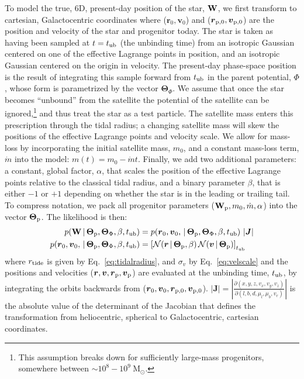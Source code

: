 \documentclass[letterpaper,12pt,preprint]{aastex}
\newcommand{\given}{\,|\,}
\newcommand{\msun}{\mathrm{M}_\odot}
\newcommand{\W}{{\bf W}}
\newcommand{\J}{{\boldsymbol J}}
\newcommand{\rtide}{r_{\rm tide}}
\newcommand{\bs}{\boldsymbol}
\newcommand{\sat}{{\rm p}}
\newcommand{\tub}{t_{\rm ub}}
\newcommand{\tailbit}{\beta}
\newcommand{\Loffset}{\alpha}
\begin{document}
To model the true, 6D, present-day position of the star, $\W$, we first transform to cartesian, Galactocentric coordinates where ($\bs{r}_0,\bs{v}_0$) and ($\bs{r}_{\sat,0},\bs{v}_{\sat,0}$) are the position and velocity of the star and progenitor today. The star is taken as having been sampled at $t=\tub$ (the unbinding time) from an isotropic Gaussian centered on one of the effective Lagrange points in position, and an isotropic Gaussian centered on the origin in velocity. The present-day phase-space position is the result of integrating this sample forward from $\tub$ in the parent potential, $\Phi$, whose form is parametrized by the vector $\bs{\Theta}_\Phi$. We assume that once the star becomes ``unbound'' from the satellite the potential of the satellite can be ignored,\footnote{This assumption breaks down for sufficiently large-mass progenitors, somewhere between $\sim10^8-10^9~\msun$.} and thus treat the star as a test particle. The satellite mass enters this prescription through the tidal radius; a changing satellite mass will skew the positions of the effective Lagrange points and velocity scale. We allow for mass-loss by incorporating the initial satellite mass, $m_0$, and a constant mass-loss term, $\dot{m}$ into the model: $m(t) = m_0 - \dot{m}t$. Finally, we add two additional parameters: a constant, global factor, $\Loffset$, that scales the position of the effective Lagrange points relative to the classical tidal radius, and a binary parameter $\tailbit$, that is either $-1$ or $+1$ depending on whether the star is in the leading or trailing tail. To compress notation, we pack all progenitor parameters ($\W_\sat, m_0, \dot{m}, \Loffset$) into the vector $\bs{\Theta}_\sat$. The likelihood is then: %
\begin{align}
	p(\W \given \bs{\Theta}_\sat, \bs{\Theta}_\Phi, \tailbit, \tub) &= p(\bs{r}_0,\bs{v}_0, \given \bs{\Theta}_\sat, \bs{\Theta}_\Phi, \tailbit, \tub)\,\left\vert\J\right\vert\label{eq:starlike}\\
	p(\bs{r}_0,\bs{v}_0, \given \bs{\Theta}_\sat, \bs{\Theta}_\Phi,\tailbit,\tub) &= \left[\mathcal{N}(\bs{r} \given \bs{\Theta}_\sat, \tailbit)\,\mathcal{N}(\bs{v} \given \bs{\Theta}_\sat)\right]_{\tub}
\end{align}
where $\rtide$ is given by Eq.~\ref{eq:tidalradius}, and $\sigma_v$ by Eq.~\ref{eq:velscale} and the positions and velocities ($\bs{r},\bs{v}, \bs{r}_{\sat},\bs{v}_{\sat}$) are evaluated at the unbinding time, $\tub$, by integrating the orbits backwards from ($\bs{r}_0,\bs{v}_0, \bs{r}_{\sat,0},\bs{v}_{\sat,0}$). $\left\vert\J\right\vert = \left\vert\frac{\partial(x,y,z,v_x,v_y,v_z)}{\partial(l,b,d,\mu_l,\mu_b,v_r)}\right\vert$ is the absolute value of the determinant of the Jacobian that defines the transformation from heliocentric, spherical to Galactocentric, cartesian coordinates. 
\end{document}

